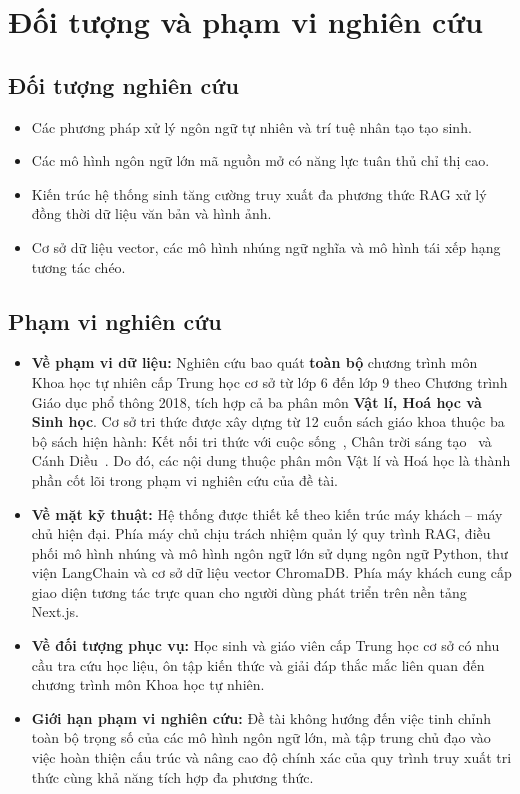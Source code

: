 \section{Đối tượng và phạm vi nghiên cứu}
\subsection{Đối tượng nghiên cứu}
\begin{itemize}
    \item Các phương pháp xử lý ngôn ngữ tự nhiên và trí tuệ nhân tạo tạo sinh.
    \item Các mô hình ngôn ngữ lớn mã nguồn mở có năng lực tuân thủ chỉ thị cao.
    \item Kiến trúc hệ thống sinh tăng cường truy xuất đa phương thức RAG xử lý đồng thời dữ liệu văn bản và hình ảnh.
    \item Cơ sở dữ liệu vector, các mô hình nhúng ngữ nghĩa và mô hình tái xếp hạng tương tác chéo.
\end{itemize}

\subsection{Phạm vi nghiên cứu}
\begin{itemize}
    \item \textbf{Về phạm vi dữ liệu:} Nghiên cứu bao quát \textbf{toàn bộ} chương trình môn Khoa học tự nhiên cấp Trung học cơ sở từ lớp 6 đến lớp 9 theo Chương trình Giáo dục phổ thông 2018, tích hợp cả ba phân môn \textbf{Vật lí, Hoá học và Sinh học}. Cơ sở tri thức được xây dựng từ 12 cuốn sách giáo khoa thuộc ba bộ sách hiện hành: Kết nối tri thức với cuộc sống~\cite{sgk_kntt6, sgk_kntt7, sgk_kntt8, sgk_kntt9}, Chân trời sáng tạo~\cite{sgk_ctst6, sgk_ctst7, sgk_ctst8, sgk_ctst9} và Cánh Diều~\cite{sgk_cd6, sgk_cd7, sgk_cd8, sgk_cd9}. Do đó, các nội dung thuộc phân môn Vật lí và Hoá học là thành phần cốt lõi trong phạm vi nghiên cứu của đề tài.
    \item \textbf{Về mặt kỹ thuật:} Hệ thống được thiết kế theo kiến trúc máy khách -- máy chủ hiện đại. Phía máy chủ chịu trách nhiệm quản lý quy trình RAG, điều phối mô hình nhúng và mô hình ngôn ngữ lớn sử dụng ngôn ngữ Python, thư viện LangChain và cơ sở dữ liệu vector ChromaDB. Phía máy khách cung cấp giao diện tương tác trực quan cho người dùng phát triển trên nền tảng Next.js.
    \item \textbf{Về đối tượng phục vụ:} Học sinh và giáo viên cấp Trung học cơ sở có nhu cầu tra cứu học liệu, ôn tập kiến thức và giải đáp thắc mắc liên quan đến chương trình môn Khoa học tự nhiên.
    \item \textbf{Giới hạn phạm vi nghiên cứu:} Đề tài không hướng đến việc tinh chỉnh toàn bộ trọng số của các mô hình ngôn ngữ lớn, mà tập trung chủ đạo vào việc hoàn thiện cấu trúc và nâng cao độ chính xác của quy trình truy xuất tri thức cùng khả năng tích hợp đa phương thức.
\end{itemize}

